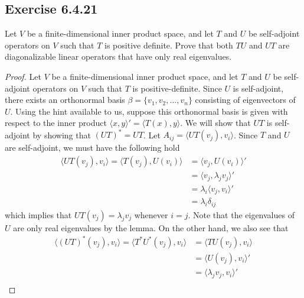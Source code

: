 \subsection*{Exercise 6.4.21} Let \( V  \) be a finite-dimensional inner product space, and let \( T  \) and \( U  \) be self-adjoint operators on \( V  \) such that \( T  \) is positive definite. Prove that both \( TU  \) and \( UT  \) are diagonalizable linear operators that have only real eigenvalues.
\begin{proof}
Let \( V  \) be a finite-dimensional inner product space, and let \( T  \) and \( U  \) be self-adjoint operators on \( V  \) such that \( T  \) is positive-definite. Since \( U  \) is self-adjoint, there exists an orthonormal basis \( \beta = \{ {v}_{1}, {v}_{2}, \dots, {v}_{n} \}  \) consisting of eigenvectors of \( U \). Using the hint available to us, suppose this orthonormal basis is given with respect to the inner product \( \langle x , y \rangle' = \langle T(x) , y \rangle \). We will show that \( UT  \) is self-adjoint by showing that \( (UT)^{*} = UT \). Let \( {A}_{ij} = \langle UT({v}_{j}) , {v}_{i} \rangle \). Since \( T  \) and \( U  \) are self-adjoint, we must have the following hold
\begin{align*}
     \langle UT({v}_{j}) , {v}_{i} \rangle = \langle T({v}_{j}) , U({v}_{i}) \rangle 
                                                     &= \langle {v}_{j} ,  U({v}_{i}) \rangle' \\
                                                     &= \langle {v}_{j} , {\lambda}_{j} {v}_{j} \rangle' \\
                                                     &= {\lambda}_{i} \langle {v}_{j} , {v}_{i} \rangle' \\
                                                     &= {\lambda}_{i} {\delta}_{ij}
\end{align*}
which implies that \( UT({v}_{j}) = {\lambda}_{j} {v}_{j} \) whenever \( i = j  \). Note that the eigenvalues of \( U  \) are only real eigenvalues by the lemma. On the other hand, we also see that
\begin{align*}
    \langle (UT)^{*}({v}_{j}) , {v}_{i}  \rangle = \langle T^{*}U^{*}({v}_{j}) , {v}_{i} \rangle &= \langle TU({v}_{j}) , {v}_{i} \rangle \\
                                                                                                  &= \langle U({v}_{j}) , {v}_{i} \rangle' \\
                                                                                                  &= \langle {\lambda}_{j}{v}_{j} , {v}_{i} \rangle' \\

\end{align*}
\end{proof}
